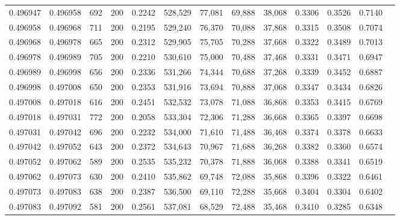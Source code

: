 \begin{tabular}{rrrrrrrrrrrrr}
0.496947 & 0.496958 &   692 & 200 &                                     0.2242 & 528,529 &  77,081 &  69,888 &  38,068 & 0.3306 & 0.3526 & 0.7140 \\
0.496958 & 0.496968 &   711 & 200 &                                     0.2195 & 529,240 &  76,370 &  70,088 &  37,868 & 0.3315 & 0.3508 & 0.7074 \\
0.496968 & 0.496978 &   665 & 200 &                                     0.2312 & 529,905 &  75,705 &  70,288 &  37,668 & 0.3322 & 0.3489 & 0.7013 \\
0.496978 & 0.496989 &   705 & 200 &                                     0.2210 & 530,610 &  75,000 &  70,488 &  37,468 & 0.3331 & 0.3471 & 0.6947 \\
0.496989 & 0.496998 &   656 & 200 &                                     0.2336 & 531,266 &  74,344 &  70,688 &  37,268 & 0.3339 & 0.3452 & 0.6887 \\
0.496998 & 0.497008 &   650 & 200 &                                     0.2353 & 531,916 &  73,694 &  70,888 &  37,068 & 0.3347 & 0.3434 & 0.6826 \\
0.497008 & 0.497018 &   616 & 200 &                                     0.2451 & 532,532 &  73,078 &  71,088 &  36,868 & 0.3353 & 0.3415 & 0.6769 \\
0.497018 & 0.497031 &   772 & 200 &                                     0.2058 & 533,304 &  72,306 &  71,288 &  36,668 & 0.3365 & 0.3397 & 0.6698 \\
0.497031 & 0.497042 &   696 & 200 &                                     0.2232 & 534,000 &  71,610 &  71,488 &  36,468 & 0.3374 & 0.3378 & 0.6633 \\
0.497042 & 0.497052 &   643 & 200 &                                     0.2372 & 534,643 &  70,967 &  71,688 &  36,268 & 0.3382 & 0.3360 & 0.6574 \\
0.497052 & 0.497062 &   589 & 200 &                                     0.2535 & 535,232 &  70,378 &  71,888 &  36,068 & 0.3388 & 0.3341 & 0.6519 \\
0.497062 & 0.497073 &   630 & 200 &                                     0.2410 & 535,862 &  69,748 &  72,088 &  35,868 & 0.3396 & 0.3322 & 0.6461 \\
0.497073 & 0.497083 &   638 & 200 &                                     0.2387 & 536,500 &  69,110 &  72,288 &  35,668 & 0.3404 & 0.3304 & 0.6402 \\
0.497083 & 0.497092 &   581 & 200 &                                     0.2561 & 537,081 &  68,529 &  72,488 &  35,468 & 0.3410 & 0.3285 & 0.6348 \\

\end{tabular}
